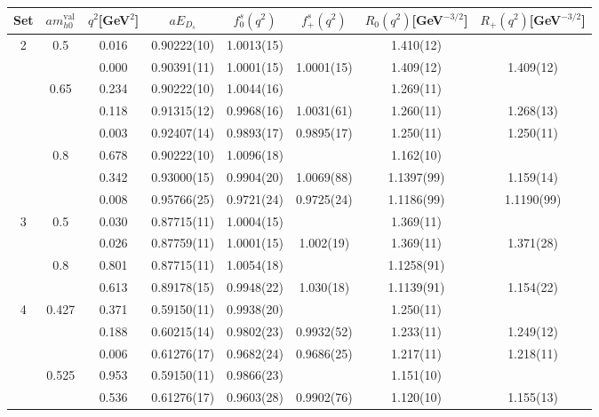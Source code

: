 \begin{table}
  \begin{center}
    \begin{tabular}{ c c c c c c c c }
      \hline
      Set & $am_{h0}^{\text{val}}$ & $q^2$[GeV$^2$]& $aE_{D_s}$& $f^s_0(q^2)$& $f^s_+(q^2)$& $R_0(q^2)$[GeV$^{-3/2}$]& $R_+(q^2)$[GeV$^{-3/2}$]\\ [0.5ex]
      \hline\hline 
      2 & 0.5 & 0.016 & 0.90222(10) & 1.0013(15) &  & 1.410(12) & \\ [0.5ex]
      &  & 0.000 & 0.90391(11) & 1.0001(15) & 1.0001(15) & 1.409(12) & 1.409(12)\\ [0.5ex]
      \hline 
      & 0.65 & 0.234 & 0.90222(10) & 1.0044(16) &  & 1.269(11) & \\ [0.5ex]
      &  & 0.118 & 0.91315(12) & 0.9968(16) & 1.0031(61) & 1.260(11) & 1.268(13)\\ [0.5ex]
      &  & 0.003 & 0.92407(14) & 0.9893(17) & 0.9895(17) & 1.250(11) & 1.250(11)\\ [0.5ex]
      \hline 
      & 0.8 & 0.678 & 0.90222(10) & 1.0096(18) &  & 1.162(10) & \\ [0.5ex]
      &  & 0.342 & 0.93000(15) & 0.9904(20) & 1.0069(88) & 1.1397(99) & 1.159(14)\\ [0.5ex]
      &  & 0.008 & 0.95766(25) & 0.9721(24) & 0.9725(24) & 1.1186(99) & 1.1190(99)\\ [0.5ex]
      \hline\hline 
      3 & 0.5 & 0.030 & 0.87715(11) & 1.0004(15) &  & 1.369(11) & \\ [0.5ex]
      &  & 0.026 & 0.87759(11) & 1.0001(15) & 1.002(19) & 1.369(11) & 1.371(28)\\ [0.5ex]
      \hline 
      & 0.8 & 0.801 & 0.87715(11) & 1.0054(18) &  & 1.1258(91) & \\ [0.5ex]
      &  & 0.613 & 0.89178(15) & 0.9948(22) & 1.030(18) & 1.1139(91) & 1.154(22)\\ [0.5ex]
      \hline\hline 
      4 & 0.427 & 0.371 & 0.59150(11) & 0.9938(20) &  & 1.250(11) & \\ [0.5ex]
      &  & 0.188 & 0.60215(14) & 0.9802(23) & 0.9932(52) & 1.233(11) & 1.249(12)\\ [0.5ex]
      &  & 0.006 & 0.61276(17) & 0.9682(24) & 0.9686(25) & 1.217(11) & 1.218(11)\\ [0.5ex]
      \hline 
      & 0.525 & 0.953 & 0.59150(11) & 0.9866(23) &  & 1.151(10) & \\ [0.5ex]
      &  & 0.536 & 0.61276(17) & 0.9603(28) & 0.9902(76) & 1.120(10) & 1.155(13)\\ [0.5ex]

\end{tabular}
\end{center}
\end{table}
